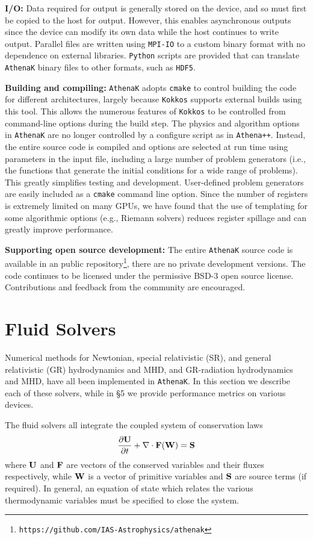 \documentclass[twocolumn, floatfix]{aastex63}
\newcommand{\app}{\texttt{Athena++}}
\newcommand{\ak}{\texttt{AthenaK}}
\newcommand{\kokkos}{\texttt{Kokkos}}
\begin{document}
{\bf I/O:} Data required for output is generally stored on the device, and so must first be copied to the host for output. However, this enables asynchronous outputs since the device can modify its own data while the host continues to write output. Parallel files are written using \texttt{MPI-IO} to a custom binary format with no dependence on external libraries.  \texttt{Python} scripts are provided that can translate \ak{} binary files to other formats, such as \texttt{HDF5}.

{\bf Building and compiling:} \ak{} adopts {\tt cmake} to control building the code for different architectures, largely because \kokkos{} supports external builds using this tool.  This allows the numerous features of \kokkos{} to be controlled from command-line options during the build step. The physics and algorithm options in \ak{} are no longer controlled by a configure script as in \app{}.  Instead, the entire source code is compiled and options are selected at run time using parameters in the input file, including a large number of problem generators (i.e., the functions that generate the initial conditions for a wide range of problems). This greatly simplifies testing and development. User-defined problem generators are easily included as a \texttt{cmake} command line option. 
 Since the number of registers is extremely limited on many GPUs, we have found that the use of templating for some algorithmic options (e.g., Riemann solvers) reduces register spillage and can greatly improve performance.

{\bf Supporting open source development:} The entire \ak{} source code is available in an public repository\footnote{\tt{https://github.com/IAS-Astrophysics/athenak}}, there are no private development versions. The code continues to be licensed under the permissive BSD-3 open source license.  Contributions and feedback from the community are encouraged.

\section{Fluid Solvers}

Numerical methods for Newtonian, special relativistic (SR), and general relativistic (GR) hydrodynamics and MHD, and GR-radiation hydrodynamics and MHD, have all been implemented in \ak{}. In this section we describe each of these solvers, while in \S5 we provide performance metrics on various devices.

The fluid solvers all integrate the coupled system of conservation laws 
\begin{equation}
\frac{\partial {\bf U}}{\partial t} + \nabla \cdot {\bf F}({\bf W}) = \bf{S}
\label{eq:fluid}
\end{equation}
where $\bf{U}$ and $\bf{F}$ are vectors of the conserved variables and their fluxes respectively, while $\bf{W}$ is a vector of primitive variables and $\bf{S}$ are source terms (if required).  In general, an equation of state which relates the various
thermodynamic variables must be specified to close the system.
\end{document}
